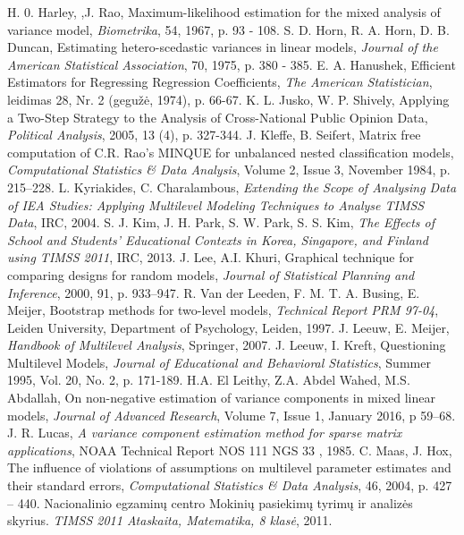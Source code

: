 \documentclass[11pt,a4paper]{article}
\begin{document}
\begin{thebibliography}{1}
 H. 0. Harley, ,J. Rao, Maximum-likelihood estimation for the mixed analysis of variance model, \textit{Biometrika}, 54, 1967, p. 93 - 108.
 S. D. Horn, R. A. Horn, D. B. Duncan, Estimating hetero-scedastic variances in linear models, \textit{Journal of the American Statistical Association}, 70, 1975, p. 380 - 385.
 E. A. Hanushek,  Efficient Estimators for Regressing Regression Coefficients, \textit{The American Statistician}, leidimas 28, Nr. 2 (gegužė, 1974), p. 66-67.
 K. L. Jusko, W. P. Shively, Applying a Two-Step Strategy to the Analysis of Cross-National Public Opinion Data, \textit{Political Analysis}, 2005, 13 (4), p. 327-344. 
 J. Kleffe, B. Seifert, Matrix free computation of C.R. Rao's MINQUE for unbalanced nested classification models, \textit{Computational Statistics \& Data Analysis}, Volume 2, Issue 3, November 1984, p. 215–228.
 L. Kyriakides, C. Charalambous, \textit{ Extending the Scope of Analysing Data of IEA Studies: Applying Multilevel Modeling Techniques to Analyse TIMSS Data}, IRC, 2004.
 S. J. Kim, J. H. Park, S. W. Park, S. S. Kim, \textit{The Effects of School and Students’ Educational Contexts in Korea, Singapore, and Finland using TIMSS 2011}, IRC, 2013.
J. Lee, A.I. Khuri, Graphical technique for comparing designs for random models, \textit{Journal of Statistical Planning and Inference}, 2000, 91, p. 933–947.
 R. Van der Leeden, F. M. T. A. Busing, E. Meijer, Bootstrap methods for two-level models, \textit{Technical Report PRM 97-04}, Leiden University, Department of Psychology, Leiden, 1997.
J. Leeuw, E. Meijer, \textit{Handbook of Multilevel Analysis}, Springer, 2007.
 J. Leeuw, I. Kreft, Questioning Multilevel Models, \textit{Journal of Educational and Behavioral Statistics}, Summer 1995, Vol. 20, No. 2, p. 171-189.
  H.A. El  Leithy, Z.A. Abdel  Wahed,  M.S.  Abdallah,  On  non-negative  estimation  of
variance components in mixed linear models, \textit{Journal of Advanced Research}, Volume 7, Issue 1, January 2016, p 59–68.
 J. R. Lucas, \textit{A variance component estimation method for sparse matrix applications}, NOAA Technical Report NOS 111 NGS 33 , 1985.
C. Maas, J. Hox, The influence of violations of assumptions on multilevel parameter estimates and their standard errors, \textit{Computational Statistics \& Data Analysis}, 46, 2004, p. 427 – 440.
 Nacionalinio egzaminų centro Mokinių pasiekimų tyrimų ir analizės skyrius. \textit{TIMSS 2011 Ataskaita, Matematika, 8 klasė}, 2011.

\end{thebibliography}
\end{document}
